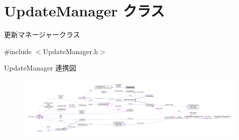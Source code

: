\hypertarget{class_update_manager}{}\section{Update\+Manager クラス}
\label{class_update_manager}


更新マネージャークラス  




{\ttfamily \#include $<$Update\+Manager.\+h$>$}



Update\+Manager 連携図\nopagebreak
\begin{figure}[H]
\begin{center}
\leavevmode
\includegraphics[width=350pt]{class_update_manager__coll__graph}
\end{center}
\end{figure}
